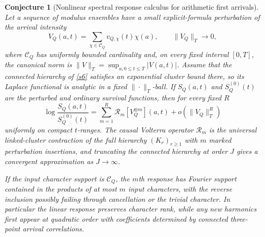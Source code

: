 \documentclass[11pt]{article}
\newtheorem{conjecture}{Conjecture}
\theoremstyle{definition}
\begin{document}
\begin{conjecture}[Nonlinear spectral response calculus for arithmetic first arrivals]\label{s9}
Let a sequence of modulus ensembles have a small explicit-formula perturbation of the
arrival intensity
\[
 V_Q(a,t)=\sum_{\chi\in\mathcal C_Q}v_{Q,\chi}(t)\chi(a),
 \qquad \|V_Q\|_{T}\to0,
\]
where $\mathcal C_Q$ has uniformly bounded cardinality and, on every fixed interval
$[0,T]$, the canonical norm is
$\|V\|_T=\sup_{a,0\le t\le T}|V(a,t)|$.  Assume that the connected hierarchy of
\cref{s6} satisfies an exponential cluster bound there, so its Laplace functional is
analytic in a fixed $\|\cdot\|_T$-ball.  If $S_Q(a,t)$ and
$S_Q^{(0)}(t)$ are the perturbed and ordinary survival functions, then for every fixed
$R$
\[
 \log\frac{S_Q(a,t)}{S_Q^{(0)}(t)}
 =\sum_{m=1}^{R}\mathcal R_m[V_Q^{\otimes m}](a,t)
   +o(\|V_Q\|_{T}^{R})
\]
uniformly on compact $t$-ranges.  The causal Volterra operator $\mathcal R_m$ is the
universal linked-cluster contraction of the full hierarchy $(K_r)_{r\ge1}$ with $m$
marked perturbation insertions, and truncating the connected hierarchy at order $J$
gives a convergent approximation as $J\to\infty$.

If the input character support is $\mathcal C_Q$, the $m$th response has Fourier support contained
in the products of at most $m$ input characters, with the reverse inclusion possibly failing through cancellation or the trivial
character.  In particular the linear response preserves character rank, while any
new harmonics first appear at quadratic order with coefficients determined by connected
three-point arrival correlations.
\end{conjecture}
\end{document}
